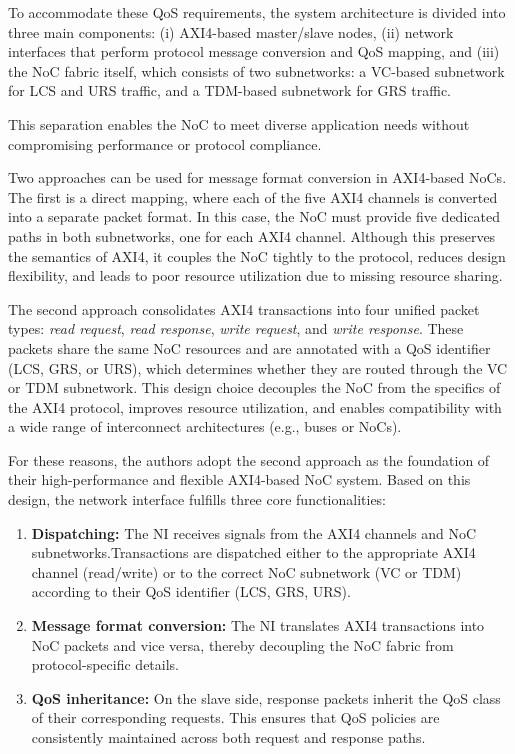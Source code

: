 To accommodate these QoS requirements, the system architecture is divided into three main components: (i) AXI4-based master/slave nodes, (ii) network interfaces that perform protocol message conversion and QoS mapping, and (iii) the NoC fabric itself, which consists of two subnetworks: a VC-based subnetwork for LCS and URS traffic, and a TDM-based subnetwork for GRS traffic. 

This separation enables the NoC to meet diverse application needs without compromising performance or protocol compliance.


Two approaches can be used for message format conversion in AXI4-based NoCs. The first is a direct mapping, where each of the five AXI4 channels is converted into a separate packet format. In this case, the NoC must provide five dedicated paths in both subnetworks, one for each AXI4 channel. Although this preserves the semantics of AXI4, it couples the NoC tightly to the protocol, reduces design flexibility, and leads to poor resource utilization due to missing resource sharing.

The second approach consolidates AXI4 transactions into four unified packet types: \textit{read request}, \textit{read response}, \textit{write request}, and \textit{write response}. These packets share the same NoC resources and are annotated with a QoS identifier (\ac{LCS}, \ac{GRS}, or \ac{URS}), which determines whether they are routed through the VC or TDM subnetwork. This design choice decouples the NoC from the specifics of the AXI4 protocol, improves resource utilization, and enables compatibility with a wide range of interconnect architectures (e.g., buses or NoCs).

For these reasons, the authors adopt the second approach as the foundation of their high-performance and flexible AXI4-based NoC system. Based on this design, the network interface fulfills three core functionalities:
\begin{enumerate}
    \item \textbf{Dispatching:} The NI receives signals from the AXI4 channels and NoC subnetworks.Transactions are dispatched either to the appropriate AXI4 channel (read/write) or to the correct NoC subnetwork (VC or TDM) according to their QoS identifier (\ac{LCS}, \ac{GRS}, \ac{URS}).
    \item \textbf{Message format conversion:} The NI translates AXI4 transactions into NoC packets and vice versa, thereby decoupling the NoC fabric from protocol-specific details.
    \item \textbf{QoS inheritance:} On the slave side, response packets inherit the QoS class of their corresponding requests. This ensures that QoS policies are consistently maintained across both request and response paths.
\end{enumerate}

